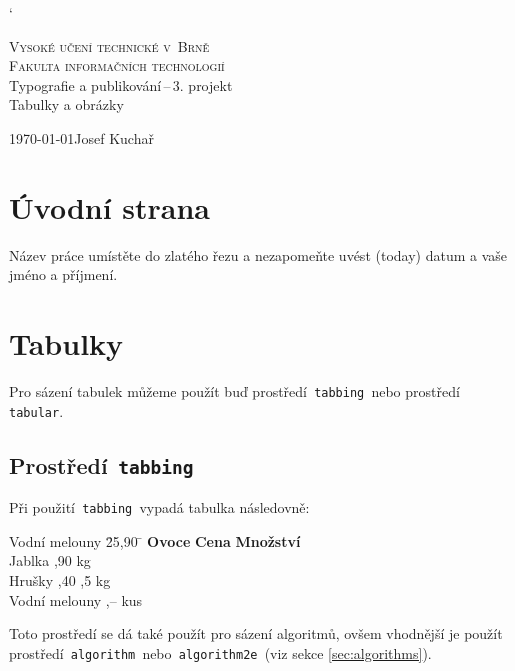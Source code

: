\documentclass[11pt]{article}
\begin{document}
\catcode`

\begin{titlepage}
    \begin{center}
        \Huge \textsc{Vysoké učení technické v~Brně} \\
        \huge \textsc{Fakulta informačních technologií} \\
        \LARGE{Typografie a publikování\,--\,3. projekt} \\
        \Huge {Tabulky a obrázky}
    \end{center}
    {\Large \today \hfill Josef Kuchař}
    \bigskip
\end{titlepage}

\section{Úvodní strana}
Název práce umístěte do zlatého řezu a nezapomeňte uvést  (today) datum a vaše jméno a příjmení.

\section{Tabulky}
Pro sázení tabulek můžeme použít buď prostředí\texttt{ tabbing }nebo prostředí\texttt{ tabular}.

\subsection{Prostředí\texttt{ tabbing}}
Při použití\texttt{ tabbing }vypadá tabulka následovně:
\begin{tabbing}
    Vodní melouny \quad \= 25,90 \quad \= \kill
    \textbf{Ovoce} \> \textbf{Cena} \> \textbf{Množství} \\
    Jablka ,90  kg \\
    Hrušky ,40 ,5 kg \\
    Vodní melouny ,--  kus \\
\end{tabbing}
Toto prostředí se dá také použít pro sázení algoritmů, ovšem vhodnější je použít prostředí\texttt{ algorithm }nebo\texttt{ algorithm2e }(viz sekce \ref{sec:algorithms}).
\end{document}
